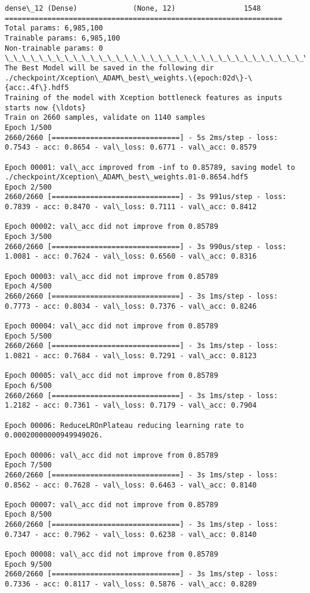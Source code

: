 \documentclass[11pt]{article}
\begin{document}
\begin{Verbatim}[commandchars=\\\{\}]
dense\_12 (Dense)             (None, 12)                1548      
=================================================================
Total params: 6,985,100
Trainable params: 6,985,100
Non-trainable params: 0
\_\_\_\_\_\_\_\_\_\_\_\_\_\_\_\_\_\_\_\_\_\_\_\_\_\_\_\_\_\_\_\_\_\_\_\_\_\_\_\_\_\_\_\_\_\_\_\_\_\_\_\_\_\_\_\_\_\_\_\_\_\_\_\_\_
The Best Model will be saved in the following dir  ./checkpoint/Xception\_ADAM\_best\_weights.\{epoch:02d\}-\{acc:.4f\}.hdf5
Training of the model with Xception bottleneck features as inputs starts now {\ldots}
Train on 2660 samples, validate on 1140 samples
Epoch 1/500
2660/2660 [==============================] - 5s 2ms/step - loss: 0.7543 - acc: 0.8654 - val\_loss: 0.6771 - val\_acc: 0.8579

Epoch 00001: val\_acc improved from -inf to 0.85789, saving model to ./checkpoint/Xception\_ADAM\_best\_weights.01-0.8654.hdf5
Epoch 2/500
2660/2660 [==============================] - 3s 991us/step - loss: 0.7839 - acc: 0.8470 - val\_loss: 0.7111 - val\_acc: 0.8412

Epoch 00002: val\_acc did not improve from 0.85789
Epoch 3/500
2660/2660 [==============================] - 3s 990us/step - loss: 1.0081 - acc: 0.7624 - val\_loss: 0.6560 - val\_acc: 0.8316

Epoch 00003: val\_acc did not improve from 0.85789
Epoch 4/500
2660/2660 [==============================] - 3s 1ms/step - loss: 0.7773 - acc: 0.8034 - val\_loss: 0.7376 - val\_acc: 0.8246

Epoch 00004: val\_acc did not improve from 0.85789
Epoch 5/500
2660/2660 [==============================] - 3s 1ms/step - loss: 1.0821 - acc: 0.7684 - val\_loss: 0.7291 - val\_acc: 0.8123

Epoch 00005: val\_acc did not improve from 0.85789
Epoch 6/500
2660/2660 [==============================] - 3s 1ms/step - loss: 1.2182 - acc: 0.7361 - val\_loss: 0.7179 - val\_acc: 0.7904

Epoch 00006: ReduceLROnPlateau reducing learning rate to 0.00020000000949949026.

Epoch 00006: val\_acc did not improve from 0.85789
Epoch 7/500
2660/2660 [==============================] - 3s 1ms/step - loss: 0.8562 - acc: 0.7628 - val\_loss: 0.6463 - val\_acc: 0.8140

Epoch 00007: val\_acc did not improve from 0.85789
Epoch 8/500
2660/2660 [==============================] - 3s 1ms/step - loss: 0.7347 - acc: 0.7962 - val\_loss: 0.6238 - val\_acc: 0.8140

Epoch 00008: val\_acc did not improve from 0.85789
Epoch 9/500
2660/2660 [==============================] - 3s 1ms/step - loss: 0.7336 - acc: 0.8117 - val\_loss: 0.5876 - val\_acc: 0.8289


\end{Verbatim}
\end{document}
